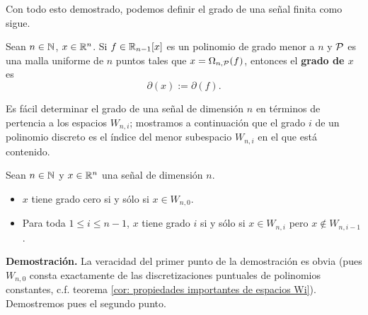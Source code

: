 Con todo esto demostrado, podemos definir
el grado de una señal finita como sigue.

\begin{defi}
\label{def: del grado de una senial finita}
Sean $n \in \mathbb{N}$, $x \in \mathbb{R}^{n}$.
Si $f \in \mathbb{R}_{n-1}[x]$
es un polinomio de grado menor a $n$
y $\mathcal{P}$ es una malla uniforme
de $n$ puntos tales que
$x= \Omega_{n, \mathcal{P}}(f)$, entonces
el \textbf{grado de $x$} es 
\[
\partial(x):= \partial(f).
\]
\end{defi}


Es fácil determinar el grado de una señal 
de dimensión $n$
en términos de pertencia a los espacios $W_{n,i}$;
mostramos a continuación que
el grado $i$ de un polinomio discreto es el índice
del menor subespacio $W_{n,i}$ en el que está contenido.

\begin{prop}
Sean $n \in \mathbb{N}$ y $x \in \mathbb{R}^{n}$ una señal de dimensión $n$.
\begin{itemize}
\item $x$ tiene grado cero si y sólo si $x \in W_{n,0}$.
\item Para toda $1 \leq i \leq n-1$,
$x$ tiene
grado $i$ si y sólo si 
$x \in W_{n,i}$ pero $x \not\in W_{n,i-1}$.
\end{itemize}
\end{prop}
\noindent
\textbf{Demostración.}
La veracidad del primer punto de la demostración
es obvia (pues $W_{n,0}$ consta exactamente de las discretizaciones
puntuales de polinomios constantes, c.f. 
teorema \ref{cor: propiedades importantes de espacios Wi}).
Demostremos pues el segundo punto.

